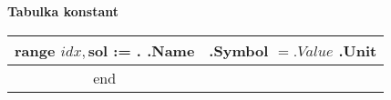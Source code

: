 \documentclass[a4paper,11pt]{article}
\begin{document}
\center\sf\large{\textbf{ Tabulka konstant }}
\begin{longtable}{|c|c|}
\\ \hline
{{range $idx, $sol := .}}
  \textbf{ {{.Name}} } & {{.Symbol}} $ = {{.Value}} $ {{.Unit}}
  \\ \hline
{{end}}
\end{longtable}
\end{document}
